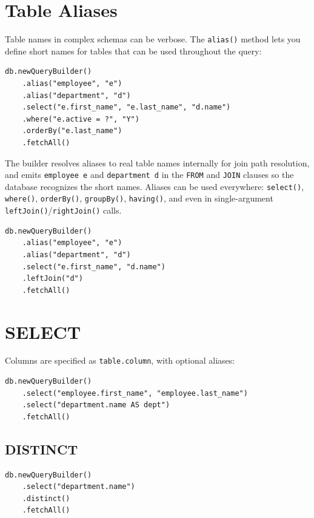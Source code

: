 \section{Table Aliases}
\label{sec:qb-alias}

Table names in complex schemas can be verbose.  The \texttt{alias()} method lets you define short names for tables that can be used throughout the query:

\begin{lstlisting}[style=groovy]
db.newQueryBuilder()
    .alias("employee", "e")
    .alias("department", "d")
    .select("e.first_name", "e.last_name", "d.name")
    .where("e.active = ?", "Y")
    .orderBy("e.last_name")
    .fetchAll()
\end{lstlisting}

\noindent
The builder resolves aliases to real table names internally for join path resolution, and emits \texttt{employee e} and \texttt{department d} in the \texttt{FROM} and \texttt{JOIN} clauses so the database recognizes the short names.  Aliases can be used everywhere: \texttt{select()}, \texttt{where()}, \texttt{orderBy()}, \texttt{groupBy()}, \texttt{having()}, and even in single-argument \texttt{leftJoin()}/\texttt{rightJoin()} calls.

\begin{lstlisting}[style=groovy]
db.newQueryBuilder()
    .alias("employee", "e")
    .alias("department", "d")
    .select("e.first_name", "d.name")
    .leftJoin("d")
    .fetchAll()
\end{lstlisting}

\section{SELECT}
\label{sec:qb-select}

Columns are specified as \texttt{table.column}, with optional aliases:

\begin{lstlisting}[style=groovy]
db.newQueryBuilder()
    .select("employee.first_name", "employee.last_name")
    .select("department.name AS dept")
    .fetchAll()
\end{lstlisting}

\subsection{DISTINCT}

\begin{lstlisting}[style=groovy]
db.newQueryBuilder()
    .select("department.name")
    .distinct()
    .fetchAll()
\end{lstlisting}

